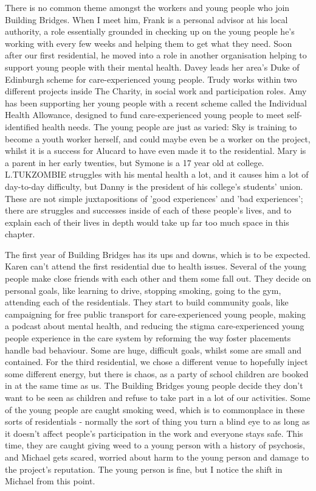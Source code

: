 There is no common theme amongst the workers and young people who join Building Bridges. When I meet him, Frank is a personal advisor at his local authority, a role essentially grounded in checking up on the young people he's working with every few weeks and helping them to get what they need. Soon after our first residential, he moved into a role in another organisation helping to support young people with their mental health. Davey leads her area's Duke of Edinburgh scheme for care-experienced young people. Trudy works within two different projects inside The Charity, in social work and participation roles. Amy has been supporting her young people with a recent scheme called the Individual Health Allowance, designed to fund care-experienced young people to meet self-identified health needs. The young people are just as varied: Sky is training to become a youth worker herself, and could maybe even be a worker on the project, whilst it is a success for Alucard to have even made it to the residential. Mary is a parent in her early twenties, but Symone is a 17 year old at college. L.TUKZOMBIE struggles with his mental health a lot, and it causes him a lot of day-to-day difficulty, but Danny is the president of his college's students' union. These are not simple juxtapositions of 'good experiences' and 'bad experiences'; there are struggles and successes inside of each of these people's lives, and to explain each of their lives in depth would take up far too much space in this chapter. 

The first year of Building Bridges has its ups and downs, which is to be expected. Karen can't attend the first residential due to health issues. Several of the young people make close friends with each other and them some fall out. They decide on personal goals, like learning to drive, stopping smoking, going to the gym, attending each of the residentials. They start to build community goals, like campaigning for free public transport for care-experienced young people, making a podcast about mental health, and reducing the stigma care-experienced young people experience in the care system by reforming the way foster placements handle bad behaviour. Some are huge, difficult goals, whilst some are small and contained. For the third residential, we chose a different venue to hopefully inject some different energy, but there is chaos, as a party of school children are booked in at the same time as us.  The Building Bridges young people decide they don't want to be seen as children and refuse to take part in a lot of our activities. Some of the young people are caught smoking weed, which is to commonplace in these sorts of residentials - normally the sort of thing you turn a blind eye to as long as it doesn't affect people's participation in the work and everyone stays safe. This time, they are caught giving weed to a young person with a history of psychosis, and Michael gets scared, worried about harm to the young person and damage to the project's reputation. The young person is fine, but I notice the shift in Michael from this point.

